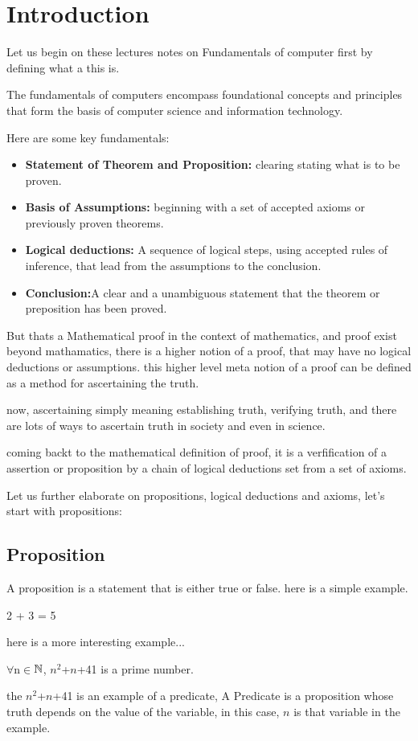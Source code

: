 \section{Introduction}

Let us begin on these lectures notes on Fundamentals of computer first by defining what a this is. 

\begin{definition}
The fundamentals of computers encompass foundational concepts and principles that form the basis of computer science and information technology.
\end{definition}
 Here are some key fundamentals:

\begin{itemize}
  \item \textbf{Statement of Theorem and Proposition:} clearing stating what is to be proven.
  \item \textbf{Basis of Assumptions:} beginning with a set of accepted axioms or previously proven theorems. 
  \item \textbf{Logical deductions:} A sequence of logical steps, using accepted rules of inference, that lead from the assumptions to the conclusion.
  \item \textbf{Conclusion:}A clear and a unambiguous statement that the theorem or preposition has been proved.
\end{itemize}

But thats a Mathematical proof in the context of mathematics, and proof exist beyond mathamatics, there is a higher notion of a proof, that may have no logical deductions or assumptions.
this higher level meta notion of a proof can be defined as a method for ascertaining the truth.

now, ascertaining simply meaning establishing truth, verifying truth, and there are lots of ways to ascertain truth in society and even in science.

coming backt to the mathematical definition of proof, it is a verfification of a assertion or proposition by a chain of logical deductions set from a set of axioms. 


Let us further elaborate on propositions, logical deductions and axioms, let's start with propositions:

\subsection{Proposition}

A proposition is a statement that is either true or false.
here is a simple example.

\begin{example}
  2 + 3 = 5
\end{example}

here is a more interesting example...

\begin{example}
$\forall$n$\in$$\mathbb{N}$, $n^2$+$n$+41 is a prime number.
\end{example}
the $n^2$+$n$+41 is an example of a predicate, A Predicate is a proposition whose truth depends on the value of the variable, in this case, $n$ is that variable in the example.





